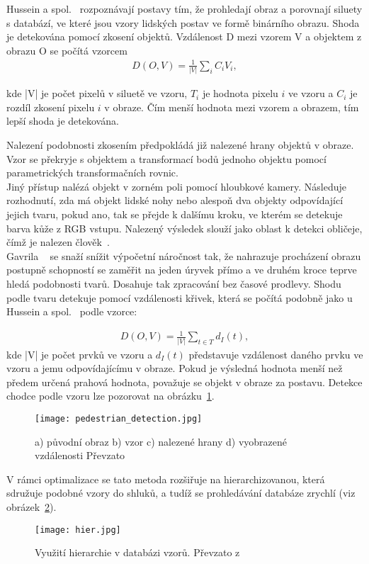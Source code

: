Hussein a spol.~\cite{9} rozpoznávají postavy tím, že prohledají obraz a porovnají siluety s databází, ve které jsou vzory lidských postav ve formě binárního obrazu. Shoda je detekována pomocí zkosení objektů. Vzdálenost D mezi vzorem V a objektem z obrazu O se počítá vzorcem
\begin{eqnarray}
 D(O,V) = \frac{1}{|V|}\sum_{i}^{}C_{i}V_{i}   ,
\end{eqnarray}

kde |V| je počet pixelů v siluetě ve vzoru, $ T_{i} $ je hodnota pixelu $ i $ ve vzoru a $ C_{i} $ je rozdíl zkosení pixelu $ i $ v obraze. Čím menší hodnota mezi vzorem a obrazem, tím lepší shoda je detekována.

Nalezení podobnosti zkosením předpokládá již nalezené hrany objektů v obraze. Vzor se překryje s objektem a transformací bodů jednoho objektu pomocí parametrických transformačních rovnic.\\

Jiný přístup nalézá objekt v zorném poli pomocí hloubkové kamery. Následuje rozhodnutí, zda má objekt lidské nohy nebo alespoň dva objekty odpovídající jejich tvaru, pokud ano, tak se přejde k dalšímu kroku, ve kterém se detekuje barva kůže z RGB vstupu. Nalezený výsledek slouží jako oblast k detekci obličeje, čímž je nalezen člověk~\cite{10}.\\

Gavrila ~\cite{7} se snaží snížit výpočetní náročnost tak, že nahrazuje procházení obrazu postupně schopností se zaměřit na jeden úryvek přímo a ve druhém kroce teprve hledá podobnosti tvarů. Dosahuje tak zpracování bez časové prodlevy.
Shodu podle tvaru detekuje pomocí vzdálenosti křivek, která se počítá podobně jako u Hussein a spol.~\cite{9} podle vzorce: 

\begin{eqnarray}
 D(O,V) = \frac{1}{|V|}\sum_{t\in T}^{}d_{I}(t) ,
\end{eqnarray}
kde |V| je počet prvků ve vzoru a $ d_{I}(t) $ představuje vzdálenost daného prvku ve vzoru a jemu odpovídajícímu v obraze. Pokud je výsledná hodnota menší než předem určená prahová hodnota, považuje se objekt v obraze za postavu. Detekce chodce podle vzoru lze pozorovat na obrázku~\ref{pic3}. \\
\begin{figure}[h]
\centering
\texttt{[image: pedestrian\_detection.jpg]}
\caption{a) původní obraz b) vzor c) nalezené hrany d) vyobrazené vzdálenosti
Převzato ~\cite{7} }
\label{pic3}
\end{figure}
\newpage 
V rámci optimalizace se tato metoda rozšiřuje na hierarchizovanou, která sdružuje podobné vzory do shluků, a tudíž se prohledávání databáze zrychlí (viz obrázek~\ref{pic4}).
\begin{figure}[h]
\centering
\texttt{[image: hier.jpg]}
\caption{Využití hierarchie v databázi vzorů. Převzato z ~\cite{7} }
\label{pic4}
\end{figure}

